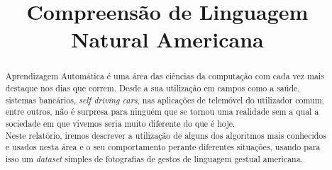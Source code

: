 \documentclass[conference]{IEEEtran}
\begin{document}
\title{Compreensão de Linguagem Natural Americana}

\author{
\and
{}
}

\maketitle

\begin{abstract}
Aprendizagem Automática é uma área das ciências da computação com cada vez mais destaque nos dias que correm. Desde a sua utilização em campos como a saúde, sistemas bancários, \textit{self driving cars}, nas aplicações de telemóvel do utilizador comum, entre outros, não é surpresa para ninguém que se tornou uma realidade sem a qual a sociedade em que vivemos seria muito diferente do que é hoje. \\
Neste relatório, iremos descrever a utilização de alguns dos algoritmos mais conhecidos e usados nesta área e o seu comportamento perante diferentes situações, usando para isso um \textit{dataset} simples de fotografias de gestos de linguagem gestual americana.
\end{abstract}





% 
% 
% 
% 



\end{document}
